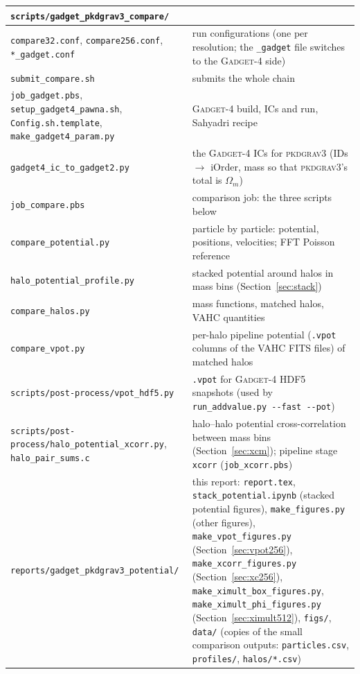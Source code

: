 \documentclass[11pt,a4paper]{article}
\newcommand{\pkd}{\textsc{pkdgrav3}}
\newcommand{\gad}{\textsc{Gadget-4}}
\newcommand{\fp}[1]{\nolinkurl{#1}}
\begin{document}
\begin{center}\small
\begin{tabular}{@{}L{0.36\textwidth}L{0.61\textwidth}@{}}
\toprule
\fp{scripts/gadget_pkdgrav3_compare/} & \\
\midrule
\fp{compare32.conf}, \fp{compare256.conf}, \fp{*_gadget.conf} & run configurations (one per resolution; the \fp{_gadget} file switches to the \gad{} side) \\
\fp{submit_compare.sh} & submits the whole chain \\
\fp{job_gadget.pbs}, \fp{setup_gadget4_pawna.sh}, \fp{Config.sh.template}, \fp{make_gadget4_param.py} & \gad{} build, ICs and run, Sahyadri recipe \\
\fp{gadget4_ic_to_gadget2.py} & the \gad{} ICs for \pkd{} (IDs $\to$ iOrder, mass so that \pkd{}'s total is $\Omega_m$) \\
\fp{job_compare.pbs} & comparison job: the three scripts below \\
\fp{compare_potential.py} & particle by particle: potential, positions, velocities; FFT Poisson reference \\
\fp{halo_potential_profile.py} & stacked potential around halos in mass bins (Section~\ref{sec:stack}) \\
\fp{compare_halos.py} & mass functions, matched halos, VAHC quantities \\
\fp{compare_vpot.py} & per-halo pipeline potential (\texttt{.vpot} columns of the VAHC FITS files) of matched halos \\
\fp{scripts/post-process/vpot_hdf5.py} & \texttt{.vpot} for \gad{} HDF5 snapshots (used by \fp{run_addvalue.py --fast --pot}) \\
\fp{scripts/post-process/halo_potential_xcorr.py}, \fp{halo_pair_sums.c} & halo--halo potential cross-correlation between mass bins (Section~\ref{sec:xcm}); pipeline stage \texttt{xcorr} (\fp{job_xcorr.pbs}) \\
\midrule
\fp{reports/gadget_pkdgrav3_potential/} & this report: \fp{report.tex}, \fp{stack_potential.ipynb} (stacked potential figures), \fp{make_figures.py} (other figures), \fp{make_vpot_figures.py} (Section~\ref{sec:vpot256}), \fp{make_xcorr_figures.py} (Section~\ref{sec:xc256}), \fp{make_ximult_box_figures.py}, \fp{make_ximult_phi_figures.py} (Section~\ref{sec:ximult512}), \fp{figs/}, \fp{data/} (copies of the small comparison outputs: \fp{particles.csv}, \fp{profiles/}, \fp{halos/*.csv}) \\
\bottomrule
\end{tabular}
\end{center}
\end{document}
